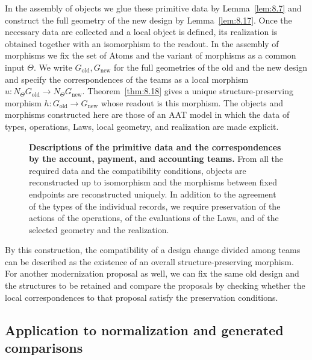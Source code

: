 In the assembly of objects we glue these primitive data by Lemma~\ref{lem:8.7} and construct
the full geometry of the new design by Lemma~\ref{lem:8.17}.
Once the necessary data are collected and a local object is defined, its realization is
obtained together with an isomorphism to the readout.
In the assembly of morphisms we fix the set of Atoms and the variant of morphisms as a common
input $\Theta$.
We write $G_{\mathrm{old}},G_{\mathrm{new}}$ for the full geometries of the old and the new
design and specify the correspondences of the teams as a local morphism
$u:N_\Theta G_{\mathrm{old}}\to N_\Theta G_{\mathrm{new}}$.
Theorem~\ref{thm:8.18} gives a unique structure-preserving morphism
$h:G_{\mathrm{old}}\to G_{\mathrm{new}}$ whose readout is this morphism.
The objects and morphisms constructed here are those of an AAT model in which the data of
types, operations, Laws, local geometry, and realization are made explicit.

\begin{figure}[htbp]
\centering

\caption{\textbf{Descriptions of the primitive data and the correspondences by the account,
payment, and accounting teams.}
From all the required data and the compatibility conditions, objects are reconstructed up to
isomorphism and the morphisms between fixed endpoints are reconstructed uniquely.
In addition to the agreement of the types of the individual records, we require preservation of the actions of the operations, of the evaluations of the Laws,
and of the selected geometry and the realization.}\label{fig:8.1}
\end{figure}

By this construction, the compatibility of a design change divided among teams can be
described as the existence of an overall structure-preserving morphism.
For another modernization proposal as well, we can fix the same old design and the structures
to be retained and compare the proposals by checking whether the local correspondences to that
proposal satisfy the preservation conditions.

\subsection*{Application to normalization and generated comparisons}

